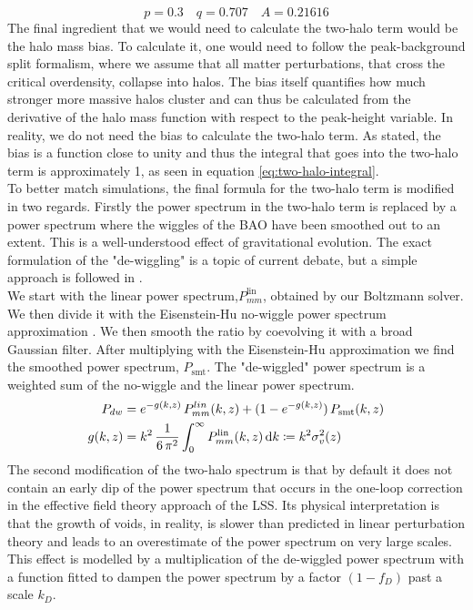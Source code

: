 \documentclass[../main.tex]{subfiles}
\begin{document}
\begin{equation*}
    p=0.3\quad q=0.707\quad A=0.21616
\end{equation*}
The final ingredient that we would need to calculate the two-halo term would be the halo mass bias. To calculate it, one would need to follow the peak-background split formalism, where we assume that all matter perturbations, that cross the critical overdensity, collapse into halos. The bias itself quantifies how much stronger more massive halos cluster and can thus be calculated from the derivative of the halo mass function with respect to the peak-height variable.
In reality, we do not need the bias to calculate the two-halo term. As stated, the bias is a function close to unity and thus the integral that goes into the two-halo term is approximately 1, as seen in equation \ref{eq:two-halo-integral}.\\
To better match simulations, the final formula for the two-halo term is modified in two regards. Firstly the power spectrum in the two-halo term is replaced by a power spectrum where the wiggles of the BAO have been smoothed out to an extent. This is a well-understood effect of gravitational evolution. The exact formulation of the "de-wiggling" is a topic of current debate, but a simple approach is followed in \hmcode.\\
We start with the linear power spectrum,$P_{mm}^\mathrm{lin}$, obtained by our Boltzmann solver. We then divide it with the Eisenstein-Hu no-wiggle power spectrum approximation \cite{Eisenstein_1998}. We then smooth the ratio by coevolving it with a broad Gaussian filter. After multiplying with the Eisenstein-Hu approximation we find the smoothed power spectrum, $P_\mathrm{smt}$. The "de-wiggled" power spectrum is a weighted sum of the no-wiggle and the linear power spectrum. \begin{align}
    P_{dw} &= e^{-g(k,z)}\,P^{lin}_{mm}(k,z) + (1-e^{-g(k,z)})\,P_\mathrm{smt}(k,z)\\
 g(k,z) &= k^2\,\frac{1}{6\,\pi^2}\int_0^\infty P^\mathrm{lin}_{mm}(k,z)\,\mathrm{d} k\coloneqq k^2 \sigma_v^2(z)
 \end{align}
The second modification of the two-halo spectrum is that by default it does not contain an early dip of the power spectrum that occurs in the one-loop correction in the effective field theory approach of the LSS. Its physical interpretation is that the growth of voids, in reality, is slower than predicted in linear perturbation theory and leads to an overestimate of the power spectrum on very large scales. This effect is modelled by a multiplication of the de-wiggled power spectrum with a function fitted to dampen the power spectrum by a factor $(1-f_D)$ past a scale $k_D$.\\
\end{document}
